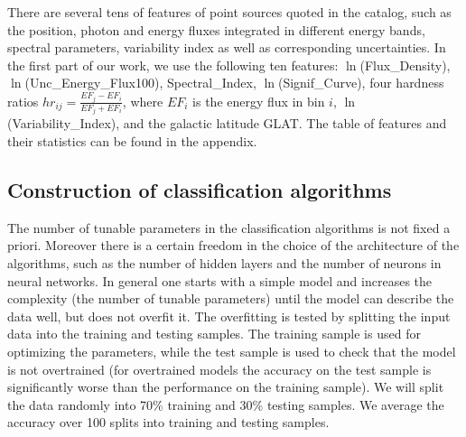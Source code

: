 There are several tens of features of point sources quoted in the catalog, such as the position, photon and energy fluxes integrated in different energy bands, spectral parameters, variability index as well as corresponding uncertainties.
In the first part of our work, we use the following ten features:
$\ln$(Flux\_Density), $\ln$(Unc\_Energy\_Flux100), Spectral\_Index, $\ln$(Signif\_Curve), 
four hardness ratios $hr_{ij} = \frac{EF_j - EF_i}{EF_j + EF_i}$, where $EF_i$ is the energy flux in bin $i$, $\ln$(Variability\_Index), and the galactic latitude GLAT.
The table of features and their statistics can be found in the appendix.

\subsection{Construction of classification algorithms}

The number of tunable parameters in the classification algorithms is not fixed a priori. 
Moreover there is a certain freedom in the choice of the architecture of the algorithms, such as
the number of hidden layers and the number of neurons in neural networks.
In general one starts with a simple model and increases the complexity (the number of tunable parameters)
until the model can describe the data well, but does not overfit it.
The overfitting is tested by splitting the input data into the training and testing samples.
The training sample is used for optimizing the parameters,
while the test sample is used to check that the model is not overtrained (for overtrained models the accuracy on the test
sample is significantly worse than the performance on the training sample).
We will split the data randomly into 70\% training and 30\% testing samples.
We average the accuracy over 100 splits into training and testing samples.

